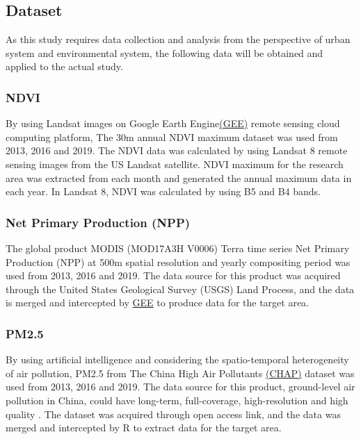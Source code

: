 \subsection{Dataset}
As this study requires data collection and analysis from the perspective of urban system and environmental system, the following data will be obtained and applied to the actual study.\\

\subsubsection{NDVI}
By using Landsat images on Google Earth Engine\href{https://github.com/Jackeytanlor/CASA_Dissertation/blob/main/code/GEE_NDVI.md}{(GEE)} remote sensing cloud computing platform, The 30m annual NDVI maximum dataset was used from 2013, 2016 and 2019. The NDVI data was calculated by using Landsat 8 remote sensing images from the US Landsat satellite. NDVI maximum for the research area was extracted from each month and generated the annual maximum data in each year. In Landsat 8, NDVI was calculated by using B5 and B4 bands.\\

\subsubsection{Net Primary Production (NPP)}
The global product MODIS (MOD17A3H V0006) Terra time series Net Primary Production (NPP)  at 500m spatial resolution and yearly compositing period was used from 2013, 2016 and 2019. The data source for this product was acquired through the United States Geological Survey (USGS) Land Process, and the data is merged and intercepted by \href{https://github.com/Jackeytanlor/CASA_Dissertation/blob/main/code/GEE_NDVI.md}{GEE} to produce data for the target area.\\

\subsubsection{PM2.5}
By using artificial intelligence and considering the spatio-temporal heterogeneity of air pollution, PM2.5 from The China High Air Pollutants \href{https://weijing-rs.github.io/product.html}{(CHAP)} dataset was used from 2013, 2016 and 2019. The data source for this product, ground-level air pollution in China, could have long-term, full-coverage, high-resolution and high quality \parencite{wei_chinahighpm10_2021}. The dataset was acquired through open access link, and the data was merged and intercepted by R to extract data for the target area.\\

